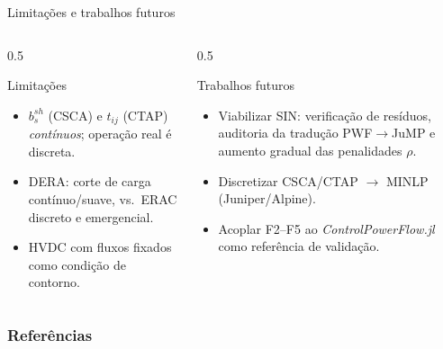 \documentclass{libs/ufc_format}
\begin{document}
\begin{frame}{Limitações e trabalhos futuros}
    \begin{columns}
        \begin{column}{0.5\textwidth}
            \begin{alertblock}{Limitações}
                \begin{itemize}
                    \item $b^{sh}_s$ (CSCA) e $t_{ij}$ (CTAP) \emph{contínuos}; operação real é discreta.
                    \item DERA: corte de carga contínuo/suave, vs.\ ERAC discreto e emergencial.
                    \item HVDC com fluxos fixados como condição de contorno.
                \end{itemize}
            \end{alertblock}
        \end{column}
        \begin{column}{0.5\textwidth}
            \begin{exampleblock}{Trabalhos futuros}
                \begin{itemize}
                    \item Viabilizar SIN: verificação de resíduos, auditoria da tradução PWF$\to$JuMP e aumento gradual das penalidades $\rho$.
                    \item Discretizar CSCA/CTAP $\rightarrow$ MINLP (Juniper/Alpine).
                    \item Acoplar F2--F5 ao \textit{ControlPowerFlow.jl} como referência de validação.
                \end{itemize}
            \end{exampleblock}
        \end{column}
    \end{columns}

    \vspace{0.4cm}
\end{frame}

\begin{frame}[allowframebreaks]
    \frametitle{Referências}
    \nocite{Template_Beamer_UFC}
    \printbibliography
\end{frame}
\end{document}
